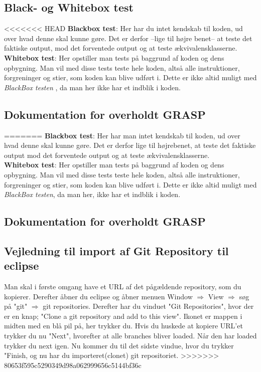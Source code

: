     \subsection{Black- og Whitebox test}
<<<<<<< HEAD
        \textbf{Blackbox test}: Her har du intet kendskab til koden, ud over hvad denne skal kunne gøre. Det er derfor --lige til højre benet-- at teste det faktiske output, mod det forventede output og at teste ækvivalensklasserne.
        \textbf{Whitebox test}: Her opstiller man tests på baggrund af koden og dens opbygning. Man vil med disse tests teste hele koden, altså alle instruktioner, forgreninger og stier, som koden kan blive udført i. Dette er ikke altid muligt med \textit{BlackBox testen} , da man her ikke har et indblik i koden.

\subsection{Dokumentation for overholdt GRASP}
=======
        \textbf{Blackbox test}: Her har man intet kendskab til koden, ud over hvad denne skal kunne gøre. Det er derfor lige til højrebenet, at teste det faktiske output mod det forventede output og at teste ækvivalensklasserne.
        \\
        \textbf{Whitebox test}: Her opstiller man tests på baggrund af koden og dens opbygning. Man vil med disse tests teste hele koden, altså alle instruktioner, forgreninger og stier, som koden kan blive udført i. Dette er ikke altid muligt med \textit{BlackBox testen}, da man her, ikke har et indblik i koden.

\subsection{Dokumentation for overholdt GRASP}

\subsection{Vejledning til import af Git Repository til eclipse}
Man skal i første omgang have et URL af det pågældende repository, som du kopierer.
Derefter åbner du eclipse og åbner menuen 
Window $\Rightarrow$ View $\Rightarrow$ søg på "git" $\Rightarrow$ git repositories.
Derefter har du vinduet "Git Repositories", hvor der er en knap; "Clone a git repository and add to this view".
Ikonet er mappen i midten med en blå pil på, her trykker du.
Hvis du huskede at kopiere URL'et trykker du nu "Next", hvorefter at alle branches bliver loaded. Når den har loaded trykker du next igen.
Nu kommer du til det sidste vindue, hvor du trykker "Finish, og nu har du importeret(clonet) git repositoriet.
>>>>>>> 80653f595c5290349d98a062999656c5144bf36c
